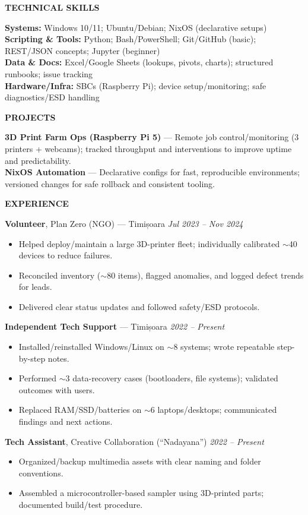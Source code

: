 \documentclass[11pt,a4paper]{article}
\newcommand{\sectionheader}[1]{\vspace{6pt}\textbf{\large #1}\par\vspace{4pt}}
\begin{document}
\sectionheader{TECHNICAL SKILLS}
\textbf{Systems:} Windows 10/11; Ubuntu/Debian; NixOS (declarative setups)\\
\textbf{Scripting \& Tools:} Python; Bash/PowerShell; Git/GitHub (basic); REST/JSON concepts; Jupyter (beginner)\\
\textbf{Data \& Docs:} Excel/Google Sheets (lookups, pivots, charts); structured runbooks; issue tracking\\
\textbf{Hardware/Infra:} SBCs (Raspberry Pi); device setup/monitoring; safe diagnostics/ESD handling

\sectionheader{PROJECTS}
\textbf{3D Print Farm Ops (Raspberry Pi 5)} — Remote job control/monitoring (3 printers + webcams); tracked throughput and interventions to improve uptime and predictability.\\
\textbf{NixOS Automation} — Declarative configs for fast, reproducible environments; versioned changes for safe rollback and consistent tooling.

\sectionheader{EXPERIENCE}
\textbf{Volunteer}, Plan Zero (NGO) --- Timișoara \hfill \textit{Jul 2023 -- Nov 2024}\\
\begin{itemize}
  \item Helped deploy/maintain a large 3D-printer fleet; individually calibrated $\sim$40 devices to reduce failures.
  \item Reconciled inventory ($\sim$80 items), flagged anomalies, and logged defect trends for leads.
  \item Delivered clear status updates and followed safety/ESD protocols.
\end{itemize}

\textbf{Independent Tech Support} --- Timișoara \hfill \textit{2022 -- Present}\\
\begin{itemize}
  \item Installed/reinstalled Windows/Linux on $\sim$8 systems; wrote repeatable step-by-step notes.
  \item Performed $\sim$3 data-recovery cases (bootloaders, file systems); validated outcomes with users.
  \item Replaced RAM/SSD/batteries on $\sim$6 laptops/desktops; communicated findings and next actions.
\end{itemize}

\textbf{Tech Assistant}, Creative Collaboration (``Nadayana'') \hfill \textit{2022 -- Present}\\
\begin{itemize}
  \item Organized/backup multimedia assets with clear naming and folder conventions.
  \item Assembled a microcontroller-based sampler using 3D-printed parts; documented build/test procedure.
\end{itemize}
\end{document}
